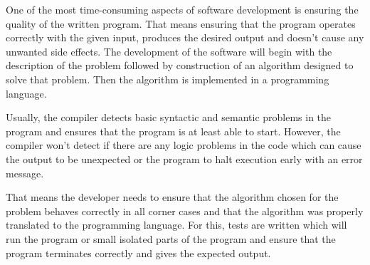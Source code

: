 \documentclass[..thesis.tex]{subfiles}
\begin{document}
One of the most time-consuming aspects of software development is ensuring the quality of the written program. 
That means ensuring that the program operates correctly with the given input, produces the desired output and doesn't cause any unwanted side effects.
The development of the software will begin with the description of the problem followed by construction of an algorithm designed to solve that problem. 
Then the algorithm is implemented in a programming language.

Usually, the compiler detects basic syntactic and semantic problems in the program and ensures that the program is at least able to start. 
However, the compiler won't detect if there are any logic problems in the code which can cause the output to be unexpected or the program to halt execution early with an error message.

That means the developer needs to ensure that the algorithm chosen for the problem behaves correctly in all corner cases and that the algorithm was properly translated to the programming language. 
For this, tests are written which will run the program or small isolated parts of the program and ensure that the program terminates correctly and gives the expected output.
% 
% 
\end{document}
